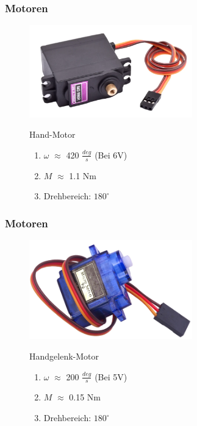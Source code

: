 \documentclass[aspectratio=169]{beamer}
\begin{document}
\begin{frame}[label = Motor3]
	\frametitle{Motoren}
	\begin{figure}[h]
		\begin{minipage}[c]{.46\linewidth}
			\centering
			\includegraphics[width = 200pt]{../resources/WristServo.png}
		\end{minipage}
		\hfill
		\begin{minipage}[c]{.46\linewidth}
			\begin{block}{Hand-Motor}
				\begin{enumerate}
					\item $\omega$ $\approx$ 420 $\frac{deg}{s}$ (Bei 6$\si{\volt}$)
					\item $M$ $\approx$ 1.1 $\si{\newton}\si{\meter}$
					\item Drehbereich: $180^\circ$
				\end{enumerate}
			\end{block}
		\end{minipage}
	\end{figure}
\end{frame}

\begin{frame}[label = Motor4]
	\frametitle{Motoren}
	\begin{figure}[h]
		\begin{minipage}[c]{.46\linewidth}
			\centering
			\includegraphics[width = 200pt]{../resources/HandServo.png}
		\end{minipage}
		\hfill
		\begin{minipage}[c]{.46\linewidth}
			\begin{block}{Handgelenk-Motor}
				\begin{enumerate}
					\item $\omega$ $\approx$ 200 $\frac{deg}{s}$ (Bei 5$\si{\volt}$)
					\item $M$ $\approx$ 0.15 $\si{\newton}\si{\meter}$
					\item Drehbereich: $180^\circ$
				\end{enumerate}
			\end{block}
		\end{minipage}
	\end{figure}
\end{frame}
\end{document}
